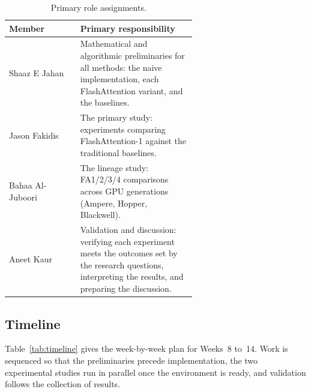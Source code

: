 \documentclass[sigconf,nonacm]{acmart}
\begin{document}
\begin{table}[h]
  \centering
  \caption{Primary role assignments.}
  \label{tab:roles}
  \small
  \begin{tabular}{@{}lp{0.62\linewidth}@{}}
    \toprule
    \textbf{Member} & \textbf{Primary responsibility} \\
    \midrule
    Shaaz E Jahan & Mathematical and algorithmic preliminaries for all methods: the
      naive implementation, each FlashAttention variant, and the baselines. \\
    Jason Fakidis & The primary study: experiments comparing FlashAttention-1
      against the traditional baselines. \\
    Bahaa Al-Juboori & The lineage study: FA1/2/3/4 comparisons across GPU
      generations (Ampere, Hopper, Blackwell). \\
    Aneet Kaur & Validation and discussion: verifying each experiment meets the
      outcomes set by the research questions, interpreting the results, and
      preparing the discussion. \\
    \bottomrule
  \end{tabular}
\end{table}

\subsection{Timeline}
Table~\ref{tab:timeline} gives the week-by-week plan for Weeks~8 to~14. Work is
sequenced so that the preliminaries precede implementation, the two experimental
studies run in parallel once the environment is ready, and validation follows the
collection of results.
\end{document}
